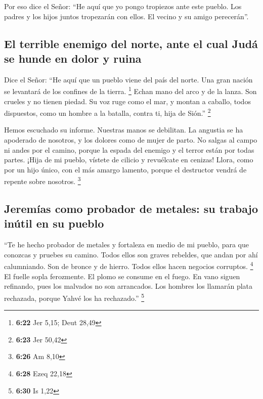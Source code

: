  Por eso dice el Señor: ``He aquí que yo pongo tropiezos
ante este pueblo. Los padres y los hijos juntos tropezarán con ellos. El
vecino y su amigo perecerán''.

\hypertarget{el-terrible-enemigo-del-norte-ante-el-cual-juduxe1-se-hunde-en-dolor-y-ruina}{%
\subsection{El terrible enemigo del norte, ante el cual Judá se hunde en
dolor y
ruina}\label{el-terrible-enemigo-del-norte-ante-el-cual-juduxe1-se-hunde-en-dolor-y-ruina}}

 Dice el Señor: ``He aquí que un pueblo viene del país
del norte. Una gran nación se levantará de los confines de la tierra.
\footnote{\textbf{6:22} Jer 5,15; Deut 28,49}  Echan mano
del arco y de la lanza. Son crueles y no tienen piedad. Su voz ruge como
el mar, y montan a caballo, todos dispuestos, como un hombre a la
batalla, contra ti, hija de Sión.'' \footnote{\textbf{6:23} Jer 50,42}

 Hemos escuchado su informe. Nuestras manos se debilitan.
La angustia se ha apoderado de nosotros, y los dolores como de mujer de
parto.  No salgas al campo ni andes por el camino, porque
la espada del enemigo y el terror están por todas partes.
 ¡Hija de mi pueblo, vístete de cilicio y revuélcate en
cenizas! Llora, como por un hijo único, con el más amargo lamento,
porque el destructor vendrá de repente sobre nosotros. \footnote{\textbf{6:26}
  Am 8,10}

\hypertarget{jeremuxedas-como-probador-de-metales-su-trabajo-inuxfatil-en-su-pueblo}{%
\subsection{Jeremías como probador de metales: su trabajo inútil en su
pueblo}\label{jeremuxedas-como-probador-de-metales-su-trabajo-inuxfatil-en-su-pueblo}}

 ``Te he hecho probador de metales y fortaleza en medio
de mi pueblo, para que conozcas y pruebes su camino. 
Todos ellos son graves rebeldes, que andan por ahí calumniando. Son de
bronce y de hierro. Todos ellos hacen negocios corruptos. \footnote{\textbf{6:28}
  Ezeq 22,18}  El fuelle sopla ferozmente. El plomo se
consume en el fuego. En vano siguen refinando, pues los malvados no son
arrancados.  Los hombres los llamarán plata rechazada,
porque Yahvé los ha rechazado.'' \footnote{\textbf{6:30} Is 1,22}

